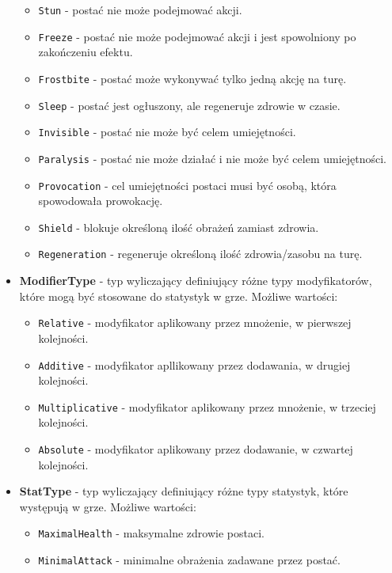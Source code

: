 \begin{itemize}
\begin{itemize}
                \item \texttt{Stun} - postać nie może podejmować akcji.
                \item \texttt{Freeze} - postać nie może podejmować akcji i jest spowolniony po zakończeniu efektu.
                \item \texttt{Frostbite} - postać może wykonywać tylko jedną akcję na turę.
                \item \texttt{Sleep} - postać jest ogłuszony, ale regeneruje zdrowie w czasie.
                \item \texttt{Invisible} - postać nie może być celem umiejętności.
                \item \texttt{Paralysis} - postać nie może działać i nie może być celem umiejętności.
                \item \texttt{Provocation} - cel umiejętności postaci musi być osobą, która spowodowała prowokację.
                \item \texttt{Shield} - blokuje określoną ilość obrażeń zamiast zdrowia.
                \item \texttt{Regeneration} - regeneruje określoną ilość zdrowia/zasobu na turę.
            \end{itemize}
        \item \textbf{ModifierType} - typ wyliczający definiujący różne typy modyfikatorów, które mogą być stosowane do statystyk w grze. 
        Możliwe wartości:
            \begin{itemize}
                \item \texttt{Relative} - modyfikator aplikowany przez mnożenie, w pierwszej kolejności.
                \item \texttt{Additive} - modyfikator apllikowany przez dodawania, w drugiej kolejności.
                \item \texttt{Multiplicative} - modyfikator aplikowany przez mnożenie, w trzeciej kolejności.
                \item \texttt{Absolute} - modyfikator aplikowany przez dodawanie, w czwartej kolejności.
            \end{itemize}
        \item \textbf{StatType} - typ wyliczający definiujący różne typy statystyk, które występują w grze. 
        Możliwe wartości:
            \begin{itemize}
                \item \texttt{MaximalHealth} - maksymalne zdrowie postaci.
                \item \texttt{MinimalAttack} - minimalne obrażenia zadawane przez postać.

\end{itemize}
\end{itemize}
